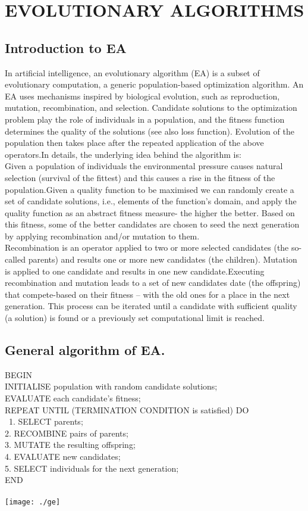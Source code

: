 \chapter{EVOLUTIONARY ALGORITHMS}

\section{Introduction to EA}In artificial intelligence, an evolutionary algorithm (EA) is a subset of evolutionary computation, a generic population-based optimization algorithm. An EA uses mechanisms inspired by biological evolution, such as reproduction, mutation, recombination, and selection. Candidate solutions to the optimization problem play the role of individuals in a population, and the fitness function determines the quality of the solutions (see also loss function). Evolution of the population then takes place after the repeated application of the above operators.In details, the underlying idea behind the algorithm is:\\
Given a population of individuals the environmental pressure causes natural selection (survival of the fittest) and this causes a rise in the fitness of the population.Given a quality function to be maximised we can randomly create a set of candidate solutions, i.e., elements of the function’s domain, and apply the quality function as an abstract fitness measure- the higher the better. Based on this fitness, some of the better candidates are chosen to seed the next generation by applying recombination and/or mutation to them.\\
Recombination is an operator applied to two or more selected candidates (the so-called parents) and results one or more new candidates (the children). Mutation is applied to one candidate and results in one new candidate.Executing recombination and mutation leads to a set of new candidates date (the 	offspring) that compete-based on their fitness – with the old ones for a place in the 	next generation. This process can be iterated until a candidate with sufficient quality (a solution) is found or a previously set computational limit is reached.\\
\section{General algorithm of EA.}BEGIN\\
        INITIALISE population with random candidate solutions;\\
		EVALUATE each candidate’s fitness;\\
		REPEAT UNTIL (TERMINATION CONDITION is satisfied) DO\\\
           1.	SELECT parents;\\
           2.	RECOMBINE pairs of parents;\\
           3.	MUTATE the resulting offspring;\\
           4.	EVALUATE new candidates;\\
           5.	SELECT individuals for the next generation;\\
        END\\\\
\texttt{[image: ./ge]}\\[1cm]
